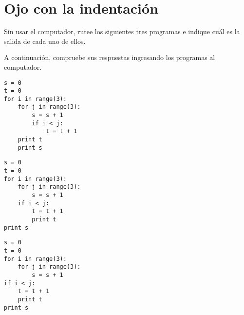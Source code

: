 \section{Ojo con la indentación}

Sin usar el computador, rutee los siguientes tres programas e indique
cuál es la salida de cada uno de ellos.

A continuación, compruebe sus respuestas ingresando los programas al
computador.

\begin{lstlisting}
s = 0
t = 0
for i in range(3):
    for j in range(3):
        s = s + 1
        if i < j:
            t = t + 1
    print t
    print s
\end{lstlisting}

\begin{lstlisting}
s = 0
t = 0
for i in range(3):
    for j in range(3):
        s = s + 1
    if i < j:
        t = t + 1
        print t
print s
\end{lstlisting}

\begin{lstlisting}
s = 0
t = 0
for i in range(3):
    for j in range(3):
        s = s + 1
if i < j:
    t = t + 1
    print t
print s
\end{lstlisting}

